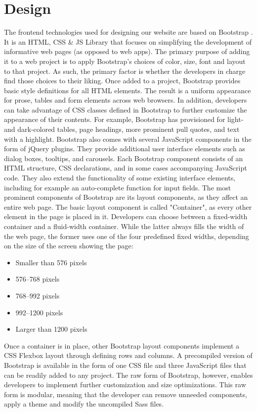 \section{Design}


The frontend technologies used for designing our website are based on Bootstrap  \cite{bootstrap}. It is an HTML, CSS \& JS Library that focuses on simplifying the development of informative web pages (as opposed to web apps). The primary purpose of adding it to a web project is to apply Bootstrap's choices of color, size, font and layout to that project. As such, the primary factor is whether the developers in charge find those choices to their liking. Once added to a project, Bootstrap provides basic style definitions for all HTML elements. The result is a uniform appearance for prose, tables and form elements across web browsers. In addition, developers can take advantage of CSS classes defined in Bootstrap to further customize the appearance of their contents. For example, Bootstrap has provisioned for light- and dark-colored tables, page headings, more prominent pull quotes, and text with a highlight.
Bootstrap also comes with several JavaScript components in the form of jQuery plugins. They provide additional user interface elements such as dialog boxes, tooltips, and carousels. Each Bootstrap component consists of an HTML structure, CSS declarations, and in some cases accompanying JavaScript code. They also extend the functionality of some existing interface elements, including for example an auto-complete function for input fields.
The most prominent components of Bootstrap are its layout components, as they affect an entire web page. The basic layout component is called "Container", as every other element in the page is placed in it. Developers can choose between a fixed-width container and a fluid-width container. While the latter always fills the width of the web page, the former uses one of the four predefined fixed widths, depending on the size of the screen showing the page:
\begin{itemize}
	\item Smaller than 576 pixels
	\item 576–768 pixels
	\item 768–992 pixels
	\item 992–1200 pixels
	\item Larger than 1200 pixels
\end{itemize}
Once a container is in place, other Bootstrap layout components implement a CSS Flexbox layout through defining rows and columns.
A precompiled version of Bootstrap is available in the form of one CSS file and three JavaScript files that can be readily added to any project. The raw form of Bootstrap, however, enables developers to implement further customization and size optimizations. This raw form is modular, meaning that the developer can remove unneeded components, apply a theme and modify the uncompiled Sass files.


